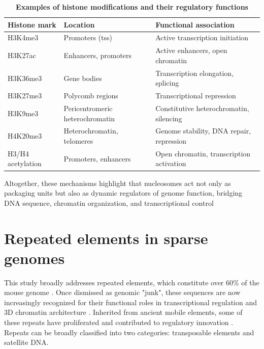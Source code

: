 \documentclass[11pt]{book}
\begin{document}
\begin{table}[h!]
\centering
\begin{tabular}{|l|l|l|}
\hline
\textbf{Histone mark} & \textbf{Location} & \textbf{Functional association}\\ \hline
H3K4me3 & Promoters (\gls{tss}) & Active transcription initiation\cite{bannister_regulation_2011, allis_molecular_2016} \\ \hline
H3K27ac & Enhancers, promoters & Active enhancers, open chromatin\cite{creyghton_histone_2010} \\ \hline
H3K36me3 & Gene bodies & Transcription elongation, splicing\cite{bannister_regulation_2011, allis_molecular_2016} \\ \hline
H3K27me3 & Polycomb regions & Transcriptional repression\cite{margueron_polycomb_2011} \\ \hline
H3K9me3 & Pericentromeric heterochromatin & Constitutive heterochromatin, silencing\cite{nakayama_role_2001} \\ \hline
H4K20me3 & Heterochromatin, telomeres & Genome stability, DNA repair, repression\cite{ebert_histone_2006} \\ \hline
H3/H4 acetylation & Promoters, enhancers & Open chromatin, transcription activation\cite{bannister_regulation_2011} \\ \hline
\end{tabular}
\caption{\textbf{Examples of histone modifications and their regulatory functions}}
\label{tab:epigenetic_marks}
\end{table}

Altogether, these mechanisms highlight that nucleosomes act not only as packaging units but also as dynamic regulators of genome function, bridging DNA sequence, chromatin organization, and transcriptional control



\section{Repeated elements in sparse genomes}
This study broadly addresses repeated elements, which constitute over 60\% of the mouse genome \cite{smit_afa_hubley_r_green_p_repeatmasker_1996}. Once dismissed as genomic "junk", these sequences are now increasingly recognized for their functional roles in transcriptional regulation \cite{jiang_role_2021} and 3D chromatin architecture \cite{cournac_3d_2016}. Inherited from ancient mobile elements, some of these repeats have proliferated and contributed to regulatory innovation \cite{schmidt_waves_2012, bakoulis_endogenous_2022}. Repeats can be broadly classified into two categories: transposable elements and satellite DNA.
\end{document}
